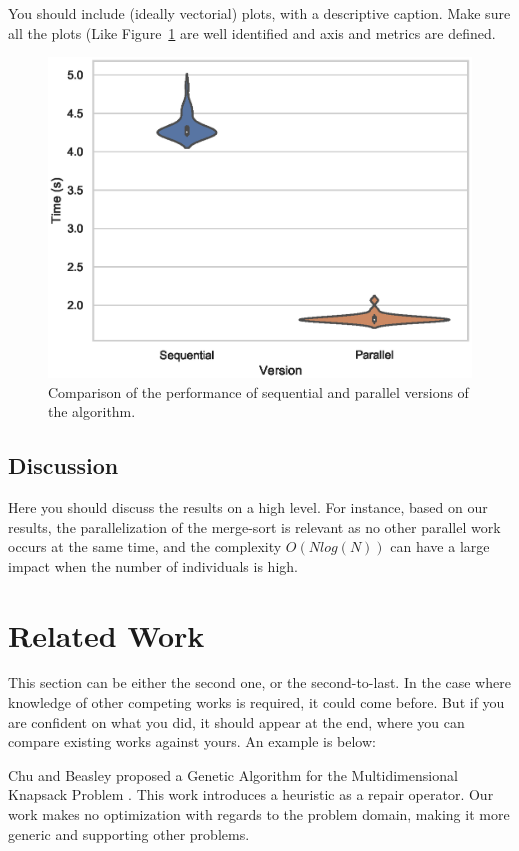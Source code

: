 \documentclass[runningheads]{llncs}
\begin{document}
You should include (ideally vectorial) plots, with a descriptive caption. Make sure all the plots (Like Figure~\ref{fig1} are well identified and axis and metrics are defined.

\begin{figure}[htbp]
\includegraphics[width=\textwidth]{code/performance.eps}
\caption{Comparison of the performance of sequential and parallel versions of the algorithm.} \label{fig1}
\end{figure}


\subsection{Discussion}

Here you should discuss the results on a high level. For instance, based on our results, the parallelization of the merge-sort is relevant as no other parallel work occurs at the same time, and the complexity $O(N log(N))$ can have a large impact when the number of individuals is high.

\section{Related Work}

This section can be either the second one, or the second-to-last. In the case where knowledge of other competing works is required, it could come before. But if you are confident on what you did, it should appear at the end, where you can compare existing works against yours. An example is below:

Chu and Beasley proposed a Genetic Algorithm for the Multidimensional Knapsack Problem \cite{DBLP:journals/heuristics/ChuB98}. This work introduces a heuristic as a repair operator. Our work makes no optimization with regards to the problem domain, making it more generic and supporting other problems.
\end{document}
